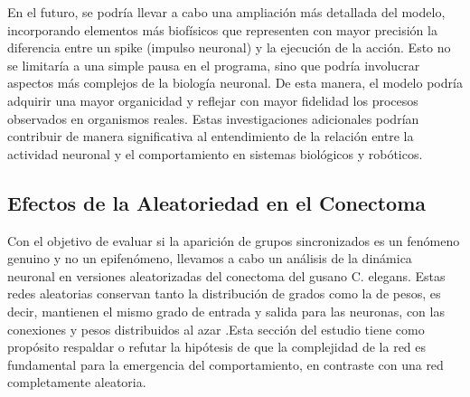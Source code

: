En el futuro, se podría llevar a cabo una ampliación más detallada del modelo, incorporando elementos más biofísicos que representen con mayor precisión la diferencia entre un spike (impulso neuronal) y la ejecución de la acción. Esto no se limitaría a una simple pausa en el programa, sino que podría involucrar aspectos más complejos de la biología neuronal. De esta manera, el modelo podría adquirir una mayor organicidad y reflejar con mayor fidelidad los procesos observados en organismos reales. Estas investigaciones adicionales podrían contribuir de manera significativa al entendimiento de la relación entre la actividad neuronal y el comportamiento en sistemas biológicos y robóticos.




\subsection{Efectos de la Aleatoriedad en el Conectoma}\label{sec:aleaotrioconectoma}

Con el objetivo de evaluar si la aparición de grupos sincronizados es un fenómeno genuino y no un epifenómeno, llevamos a cabo un análisis de la dinámica neuronal en versiones aleatorizadas del conectoma del gusano C. elegans. Estas redes aleatorias conservan tanto la distribución de grados como la de pesos, es decir, mantienen el mismo grado de entrada y salida para las neuronas, con las conexiones y pesos distribuidos al azar \cite{milo_network_2002}.Esta sección del estudio tiene como propósito respaldar o refutar la hipótesis de que la complejidad de la red es fundamental para la emergencia del comportamiento, en contraste con una red completamente aleatoria.


